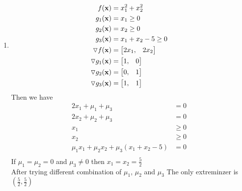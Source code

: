 \documentclass{article}
\begin{document}
\begin{enumerate} [label=(\alph*)]
\item 
\begin{align*} 
f(\boldsymbol{\mathrm{x}}) & = x_1^2 + x_2 ^ 2 \\
g_1(\boldsymbol{\mathrm{x}}) & = x_1 \geq 0 \\
g_2(\boldsymbol{\mathrm{x}}) & = x_2 \geq 0 \\
g_3(\boldsymbol{\mathrm{x}}) & = x_1 +x_2 -5 \geq 0 \\
\triangledown f(\boldsymbol{\mathrm{x}}) &= \begin{bmatrix} 2x_1, & 2x_2 \end{bmatrix} \\
\triangledown g_1(\boldsymbol{\mathrm{x}}) &= \begin{bmatrix} 1, & 0  \end{bmatrix} \\
\triangledown g_2(\boldsymbol{\mathrm{x}}) &= \begin{bmatrix} 0, & 1 \end{bmatrix}  \\
\triangledown g_3(\boldsymbol{\mathrm{x}}) &= \begin{bmatrix} 1, & 1 \end{bmatrix}  \\
\end{align*}
Then we have \begin{align*} 
2x_1 + \mu_1 +\mu_3 & = 0 \\
2x_2 + \mu_2 +\mu_3 & = 0 \\
x_1 & \geq 0 \\
x_2 & \geq 0 \\
\mu_1 x_1 + \mu_2x_2 + \mu_3 (x_1 + x_2 -5)  & = 0 \\
\end{align*} 
If $\mu_1 = \mu_2 =  0$ and $\mu_3\neq 0 $  then $x_1= x_2 = \frac{5}{2} $\\
After trying different combination of $\mu_1$, $\mu_2$ and $\mu_3$ 
The only extreminzer is $(\frac{5}{2}, \frac{5}{2}) $ 



\end{enumerate}
\end{document}
